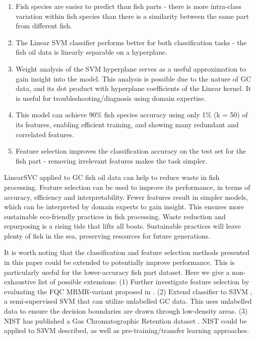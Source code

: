 \documentclass[runningheads]{llncs}
\begin{document}
\begin{enumerate}
  \item Fish species are easier to predict than fish parts - there is more intra-class variation within fish species than there is a similarity between the same part from different fish.
  \item The Linear SVM classifier performs better for both classification tasks - the fish oil data is linearly separable on a hyperplane.
  \item Weight analysis of the SVM hyperplane serves as a useful approximation to gain insight into the model. This analysis is possible due to the nature of GC data, and its dot product with hyperplane coefficients of the Linear kernel. It is useful for troubleshooting/diagnosis using domain expertise. 
  \item This model can achieve 90\% fish species accuracy using only 1\% (k = 50) of its features, enabling efficient training, and showing many redundant and correlated features. 
  \item Feature selection improves the classification accuracy on the test set for the fish part - removing irrelevant features makes the task simpler. 
\end{enumerate}

LinearSVC applied to GC fish oil data can help to reduce waste in fish processing. 
Feature selection can be used to improve its performance, in terms of accuracy, efficiency and interpretability. 
Fewer features result in simpler models, which can be interpreted by domain experts to gain insight.
This ensures more sustainable eco-friendly practices in fish processing.
Waste reduction and repurposing is a rising tide that lifts all boats.
Sustainable practices will leave plenty of fish in the sea, preserving resources for future generations. 


It is worth noting that the classification and feature selection methods presented in this paper could be extended to potentially improve performance. 
This is particularly useful for the lower-accuracy fish part dataset. 
Here we give a non-exhaustive list of possible extensions: 
(1) Further investigate feature selection by evaluating the FQC MRMR-variant proposed in \cite{zhao2019maximum}. 
(2) Extend classifier to S3VM \cite{zemmal2016adaptative}, a semi-supervised SVM that can utilize unlabelled GC data. 
This uses unlabelled data to ensure the decision boundaries are drawn through low-density areas.
(3) NIST has published a Gas Chromatographic Retention dataset \cite{kovats1958gas}. 
NIST could be applied to S3VM described, as well as pre-training/transfer learning approaches. 
\end{document}
